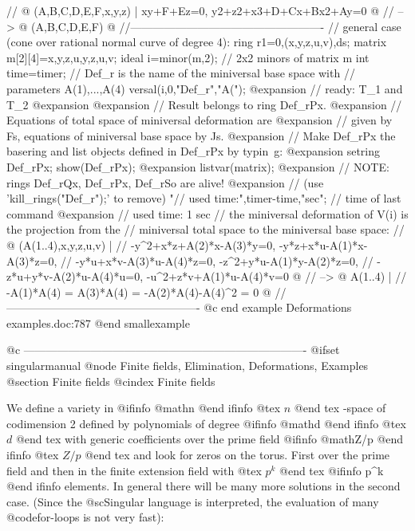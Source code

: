   // @{ (A,B,C,D,E,F,x,y,z) | xy+F+Ez=0, y2+z2+x3+D+Cx+Bx2+Ay=0 @}
  //  --> @{ (A,B,C,D,E,F) @}
  //----------------------------------------------------
  // general case (cone over rational normal curve of degree 4):
  ring r1=0,(x,y,z,u,v),ds;
  matrix m[2][4]=x,y,z,u,y,z,u,v;
  ideal i=minor(m,2);                 // 2x2 minors of matrix m
  int time=timer;
  // Def_r is the name of the miniversal base space with
  // parameters A(1),...,A(4)
  versal(i,0,"Def_r","A(");
@expansion{} // ready: T_1 and T_2
@expansion{} 
@expansion{} // Result belongs to ring Def_rPx.
@expansion{} // Equations of total space of miniversal deformation are 
@expansion{} // given by Fs, equations of miniversal base space by Js.
@expansion{} // Make Def_rPx the basering and list objects defined in Def_rPx by typin\
   g:
@expansion{}    setring Def_rPx; show(Def_rPx);
@expansion{}    listvar(matrix);
@expansion{} // NOTE: rings Def_rQx, Def_rPx, Def_rSo are alive!
@expansion{} // (use 'kill_rings("Def_r");' to remove)
  "// used time:",timer-time,"sec";   // time of last command
@expansion{} // used time: 1 sec
  // the miniversal deformation of V(i) is the projection from the
  // miniversal total space to the miniversal base space:
  // @{ (A(1..4),x,y,z,u,v) |
  //         -y^2+x*z+A(2)*x-A(3)*y=0, -y*z+x*u-A(1)*x-A(3)*z=0,
  //         -y*u+x*v-A(3)*u-A(4)*z=0, -z^2+y*u-A(1)*y-A(2)*z=0,
  //         -z*u+y*v-A(2)*u-A(4)*u=0, -u^2+z*v+A(1)*u-A(4)*v=0 @}
  //  --> @{ A(1..4) |
  //         -A(1)*A(4) = A(3)*A(4) = -A(2)*A(4)-A(4)^2 = 0 @}
  //----------------------------------------------------
@c end example Deformations examples.doc:787
@end smallexample

@c ----------------------------------------------------------------------------
@ifset singularmanual
@node Finite fields, Elimination, Deformations, Examples
@section Finite fields
@cindex Finite fields

We define a variety in 
@ifinfo
@math{n}
@end ifinfo
@tex
$n$
@end tex
-space of codimension 2 defined by
polynomials of degree 
@ifinfo
@math{d}
@end ifinfo
@tex
$d$
@end tex
 with generic coefficients over the prime
field 
@ifinfo
@math{Z/p}
@end ifinfo
@tex
$Z/p$
@end tex
 and look for zeros on the torus. First over the prime
field and then in the finite extension field with
@tex
$p^k$
@end tex
@ifinfo
p^k
@end ifinfo
elements.
In general there will be many more solutions in the second case.
(Since the @sc{Singular} language is interpreted, the evaluation of many
@code{for}-loops is not very fast):

